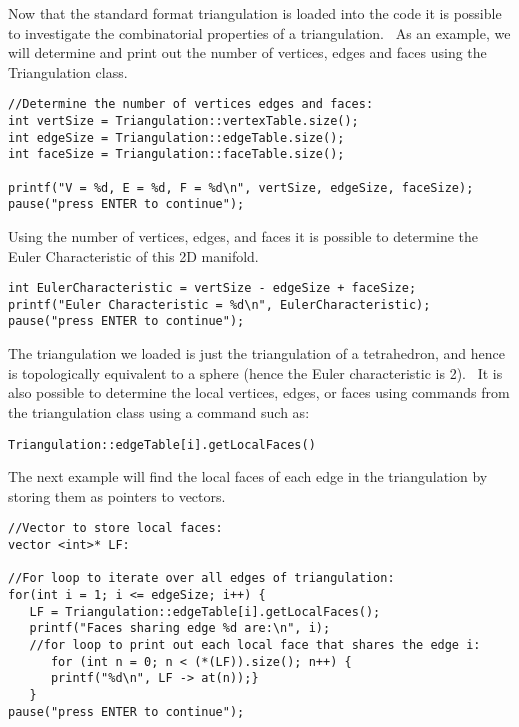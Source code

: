 \documentclass{amsart}
\theoremstyle{plain}
\numberwithin{equation}{section}
\begin{document}
\bigskip 

Now that the standard format triangulation is loaded into the code it is
possible to investigate the combinatorial properties of a triangulation. \
As an example, we will determine and print out the number of vertices, edges
and faces using the Triangulation class.\newline
\begin{verbatim}
//Determine the number of vertices edges and faces:
int vertSize = Triangulation::vertexTable.size();
int edgeSize = Triangulation::edgeTable.size();
int faceSize = Triangulation::faceTable.size();
 
printf("V = %d, E = %d, F = %d\n", vertSize, edgeSize, faceSize);
pause("press ENTER to continue");
\end{verbatim}

\bigskip 

Using the number of vertices, edges, and faces it is possible to determine
the Euler Characteristic of this 2D manifold.\newline
\begin{verbatim}
int EulerCharacteristic = vertSize - edgeSize + faceSize;
printf("Euler Characteristic = %d\n", EulerCharacteristic);
pause("press ENTER to continue");
\end{verbatim}

\bigskip 

The triangulation we loaded is just the triangulation of a tetrahedron, and
hence is topologically equivalent to a sphere (hence the Euler
characteristic is 2). \ It is also possible to determine the local vertices,
edges, or faces using commands from the triangulation class using a command
such as:

\texttt{Triangulation::edgeTable[i].getLocalFaces()}

The next example will find the local faces of each edge in the triangulation
by storing them as pointers to vectors. \newline
\begin{verbatim}
//Vector to store local faces:
vector <int>* LF:
 
//For loop to iterate over all edges of triangulation:
for(int i = 1; i <= edgeSize; i++) {
   LF = Triangulation::edgeTable[i].getLocalFaces();
   printf("Faces sharing edge %d are:\n", i);
   //for loop to print out each local face that shares the edge i:
      for (int n = 0; n < (*(LF)).size(); n++) {
      printf("%d\n", LF -> at(n));}
   }
pause("press ENTER to continue");
\end{verbatim}
\end{document}
